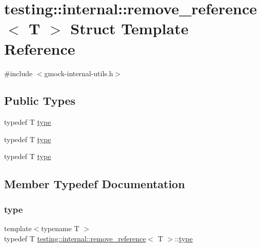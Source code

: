\hypertarget{structtesting_1_1internal_1_1remove__reference}{}\section{testing\+::internal\+::remove\+\_\+reference$<$ T $>$ Struct Template Reference}
\label{structtesting_1_1internal_1_1remove__reference}


{\ttfamily \#include $<$gmock-\/internal-\/utils.\+h$>$}

\subsection*{Public Types}
\begin{DoxyCompactItemize}
\item 
typedef T \mbox{\hyperlink{structtesting_1_1internal_1_1remove__reference_a291edca52c59a0d211977d4802439b8a}{type}}
\item 
typedef T \mbox{\hyperlink{structtesting_1_1internal_1_1remove__reference_a291edca52c59a0d211977d4802439b8a}{type}}
\item 
typedef T \mbox{\hyperlink{structtesting_1_1internal_1_1remove__reference_a291edca52c59a0d211977d4802439b8a}{type}}
\end{DoxyCompactItemize}


\subsection{Member Typedef Documentation}
\mbox{\label{structtesting_1_1internal_1_1remove__reference_a291edca52c59a0d211977d4802439b8a}} 
\subsubsection{\texorpdfstring{type}{type}\hspace{0.1cm}{\footnotesize\ttfamily [1/3]}}
{\footnotesize\ttfamily template$<$typename T $>$ \\
typedef T \mbox{\hyperlink{structtesting_1_1internal_1_1remove__reference}{testing\+::internal\+::remove\+\_\+reference}}$<$ T $>$\+::\mbox{\hyperlink{structtesting_1_1internal_1_1remove__reference_a291edca52c59a0d211977d4802439b8a}{type}}}

